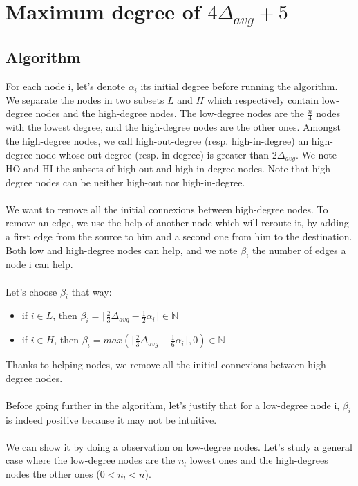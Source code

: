 \documentclass{article}
\begin{document}
\section{Maximum degree of $4\Delta_{avg} + 5$}

\subsection{Algorithm}

For each node i, let's denote $\alpha_i$ its initial degree before running
the algorithm.
We separate the nodes in two subsets $L$ and $H$ which respectively contain
low-degree nodes and the high-degree nodes. The low-degree nodes are
the $\frac{n}{4}$ nodes with the lowest degree, and the high-degree nodes
are the other ones.
Amongst the high-degree nodes, we call high-out-degree (resp. high-in-degree)
an high-degree node whose out-degree (resp. in-degree) is greater than
$2\Delta_{avg}$.
We note HO and HI the subsets of high-out and high-in-degree nodes.
Note that high-degree nodes can be neither high-out nor high-in-degree.\\\\
We want to remove all the initial connexions between high-degree nodes.
To remove an edge, we use the help of another node which will reroute
it, by adding a first edge from the source to him and a second
one from him to the destination.
Both low and high-degree nodes can help, and we note
$\beta_i$ the number of edges a node i can help.\\\\
Let's choose $\beta_i$ that way:
\begin{itemize}
  \item if $i \in L$, then
  $\beta_i = \lceil\frac{2}{3}\Delta_{avg}-\frac{1}{2}\alpha_i\rceil \in \mathbb{N}$
  \item if $i \in H$, then
  $\beta_i = max(\lceil\frac{2}{3}\Delta_{avg}-\frac{1}{6}\alpha_i\rceil, 0) \in \mathbb{N}$
\end{itemize}
Thanks to helping nodes, we remove all the initial connexions between high-degree nodes.\\\\
Before going further in the algorithm, let's justify that for a low-degree
node i, $\beta_i$ is indeed positive because it may not be intuitive.\\\\
We can show it by doing a observation on low-degree nodes.
Let's study a general case where the low-degree nodes are the
$n_l$ lowest ones and the high-degrees nodes the other ones ($0 < n_l < n$).
\end{document}
